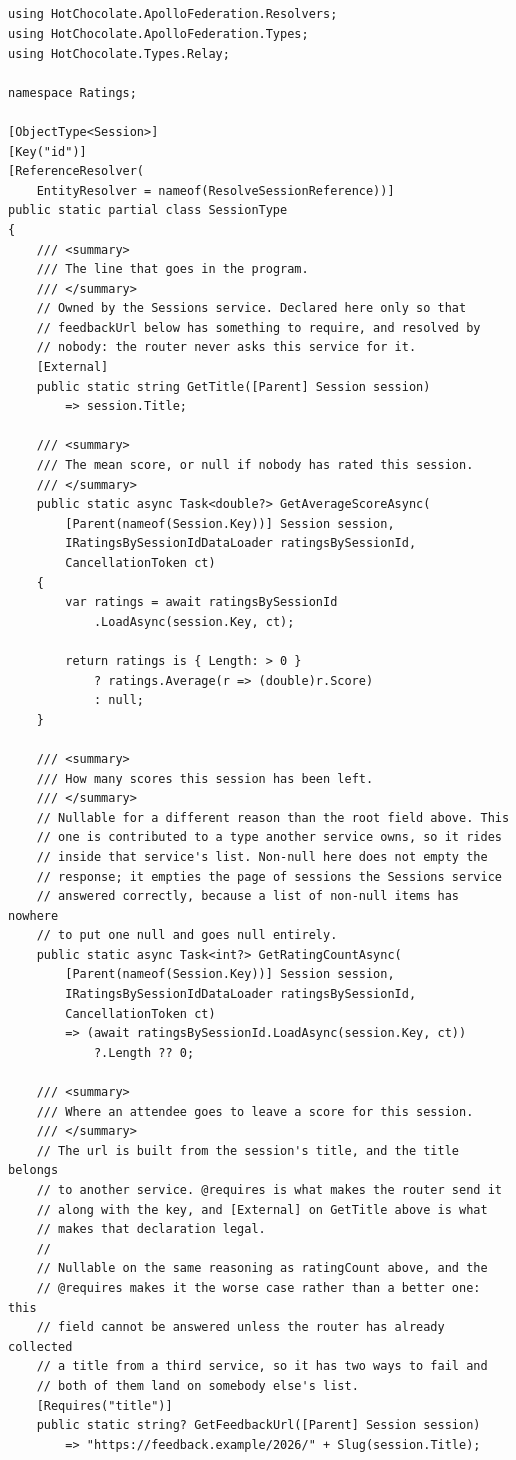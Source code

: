 \subsection*{}
\begin{verbatim}
using HotChocolate.ApolloFederation.Resolvers;
using HotChocolate.ApolloFederation.Types;
using HotChocolate.Types.Relay;

namespace Ratings;

[ObjectType<Session>]
[Key("id")]
[ReferenceResolver(
    EntityResolver = nameof(ResolveSessionReference))]
public static partial class SessionType
{
    /// <summary>
    /// The line that goes in the program.
    /// </summary>
    // Owned by the Sessions service. Declared here only so that
    // feedbackUrl below has something to require, and resolved by
    // nobody: the router never asks this service for it.
    [External]
    public static string GetTitle([Parent] Session session)
        => session.Title;

    /// <summary>
    /// The mean score, or null if nobody has rated this session.
    /// </summary>
    public static async Task<double?> GetAverageScoreAsync(
        [Parent(nameof(Session.Key))] Session session,
        IRatingsBySessionIdDataLoader ratingsBySessionId,
        CancellationToken ct)
    {
        var ratings = await ratingsBySessionId
            .LoadAsync(session.Key, ct);

        return ratings is { Length: > 0 }
            ? ratings.Average(r => (double)r.Score)
            : null;
    }

    /// <summary>
    /// How many scores this session has been left.
    /// </summary>
    // Nullable for a different reason than the root field above. This
    // one is contributed to a type another service owns, so it rides
    // inside that service's list. Non-null here does not empty the
    // response; it empties the page of sessions the Sessions service
    // answered correctly, because a list of non-null items has nowhere
    // to put one null and goes null entirely.
    public static async Task<int?> GetRatingCountAsync(
        [Parent(nameof(Session.Key))] Session session,
        IRatingsBySessionIdDataLoader ratingsBySessionId,
        CancellationToken ct)
        => (await ratingsBySessionId.LoadAsync(session.Key, ct))
            ?.Length ?? 0;

    /// <summary>
    /// Where an attendee goes to leave a score for this session.
    /// </summary>
    // The url is built from the session's title, and the title belongs
    // to another service. @requires is what makes the router send it
    // along with the key, and [External] on GetTitle above is what
    // makes that declaration legal.
    //
    // Nullable on the same reasoning as ratingCount above, and the
    // @requires makes it the worse case rather than a better one: this
    // field cannot be answered unless the router has already collected
    // a title from a third service, so it has two ways to fail and
    // both of them land on somebody else's list.
    [Requires("title")]
    public static string? GetFeedbackUrl([Parent] Session session)
        => "https://feedback.example/2026/" + Slug(session.Title);


\end{verbatim}
